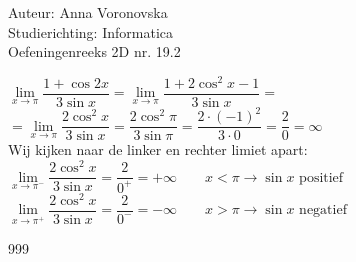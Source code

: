 \documentclass[a4paper]{article}
\begin{document}
  
\noindent \large Auteur: Anna Voronovska \\
\noindent \large Studierichting: Informatica\\
\noindent \large Oefeningenreeks 2D nr. 19.2\\

\medskip

\normalsize

$\lim\limits_{x \to \pi} \dfrac{1+\cos 2x}{3 \sin x} = \lim\limits_{x \to \pi} \dfrac{1+2\cos^2 x - 1}{3 \sin x} =$ \\

$= \lim\limits_{x \to \pi} \dfrac{2\cos^2 x}{3 \sin x} = \dfrac{2\cos^2 \pi}{3 \sin \pi} = \dfrac{2 \cdot (-1)^2}{3 \cdot 0} = \dfrac{2}{0} = \infty$ \\

Wij kijken naar de linker en rechter limiet apart: \\

$\lim\limits_{x \to \pi^-} \dfrac{2\cos^2 x}{3 \sin x} = \dfrac{2}{0^+} = +\infty \quad \quad x < \pi \to \sin x \text{ positief}$ \\

$\lim\limits_{x \to \pi^+} \dfrac{2\cos^2 x}{3 \sin x} = \dfrac{2}{0^-} = -\infty \quad \quad x > \pi \to \sin x \text{ negatief}$

\begin{thebibliography}{999}
\end{thebibliography}
\end{document}

